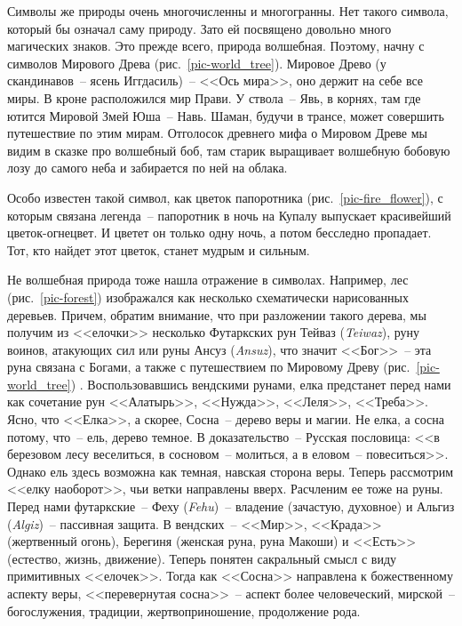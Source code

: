 \documentclass[pscyr,titlepage,chapters]{hedreport}
\begin{document}
  Символы же природы очень многочисленны и многогранны. Нет такого символа,
  который бы означал саму природу. Зато ей посвящено довольно много магических
  знаков. Это прежде всего, природа волшебная. Поэтому, начну с символов
  Мирового Древа (рис.~\ref{pic-world_tree}). Мировое Древо
  (у скандинавов~-- ясень Иггдасиль)~-- <<Ось мира>>, оно держит на себе все
  миры. В кроне расположился мир Прави. У ствола~-- Явь, в корнях, там где
  ютится Мировой Змей Юша~-- Навь. Шаман, будучи в трансе, может совершить
  путешествие по этим мирам. Отголосок древнего
  мифа о Мировом Древе мы видим в сказке про волшебный боб, там старик
  выращивает волшебную бобовую лозу до самого неба и забирается по ней на
  облака.

  Особо известен такой символ, как цветок папоротника
  (рис.~\ref{pic-fire_flower}), с которым связана легенда~-- папоротник в ночь
  на Купалу выпускает красивейший цветок-огнецвет. И цветет он только одну ночь,
  а потом бесследно пропадает. Тот, кто найдет этот цветок, станет мудрым и
  сильным.

  Не волшебная природа тоже нашла отражение в символах. Например, лес
  (рис.~\ref{pic-forest}) изображался как несколько схематически нарисованных
  деревьев. Причем, обратим внимание, что при разложении такого дерева, мы
  получим из <<елочки>> несколько Футаркских рун Тейваз (\emph{Teiwaz}), руну
  воинов, атакующих сил или руны Ансуз (\emph{Ansuz}), что значит <<Бог>>~-- эта
  руна связана с Богами, а также с путешествием по Мировому Древу
  (рис.~\ref{pic-world_tree}) \cite{5}. Воспользовавшись вендскими рунами, елка
  предстанет перед нами как сочетание рун <<Алатырь>>, <<Нужда>>, <<Леля>>,
  <<Треба>>. Ясно, что <<Елка>>, а скорее, Сосна~-- дерево веры и магии. Не
  елка, а сосна потому, что~-- ель, дерево темное. В доказательство~-- Русская
  пословица: <<в березовом лесу веселиться, в сосновом~-- молиться, а в
  еловом~-- повеситься>>. Однако ель здесь возможна как темная, навская сторона
  веры. Теперь рассмотрим <<елку наоборот>>, чьи ветки направлены вверх.
  Расчленим ее тоже на руны. Перед нами футаркские~-- Феху (\emph{Fehu})~--
  владение (зачастую, духовное) и Альгиз (\emph{Algiz})~-- пассивная защита. В
  вендских~-- <<Мир>>, <<Крада>> (жертвенный огонь), Берегиня (женская руна,
  руна Макоши) и <<Есть>> (естество, жизнь, движение). Теперь понятен сакральный
  смысл с виду примитивных <<елочек>>. Тогда как <<Сосна>> направлена к
  божественному аспекту веры, <<перевернутая сосна>>~-- аспект более
  человеческий, мирской~-- богослужения, традиции, жертвоприношение, продолжение
  рода.
\end{document}
